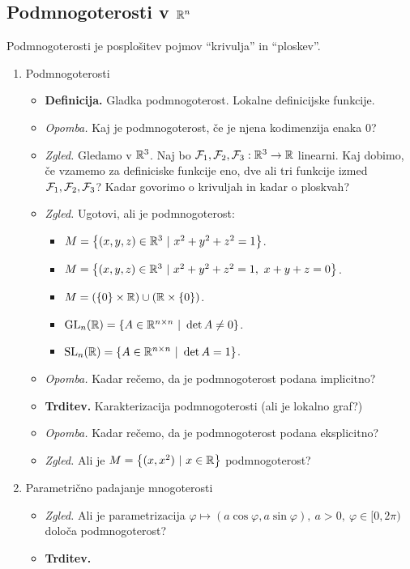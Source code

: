 \subsection{Podmnogoterosti v $\mathbb{R}^n$}
Podmnogoterosti je posplošitev pojmov "`krivulja"' in "`ploskev"'.
\begin{enumerate}
    \item Podmnogoterosti
    \begin{itemize}
        \item \colorbox{purple!30}{\textbf{Definicija.}} Gladka podmnogoterost. Lokalne definicijske funkcije.
        \item \colorbox{yellow!30}{\emph{Opomba.}} Kaj je podmnogoterost, če je njena kodimenzija enaka $0$?
        \item \colorbox{yellow!30}{\emph{Zgled.}} Gledamo v $\mathbb{R}^3$. Naj bo $\mathcal{F}_1, \mathcal{F}_2, \mathcal{F}_3: \mathbb{R}^3 \to \mathbb{R}$ linearni. Kaj dobimo, če vzamemo za definiciske funkcije eno, dve ali tri funkcije izmed $\mathcal{F}_1, \mathcal{F}_2, \mathcal{F}_3$? Kadar govorimo o krivuljah in kadar o ploskvah?
        \item \colorbox{yellow!30}{\emph{Zgled.}} Ugotovi, ali je podmnogoterost:
        \begin{itemize}
            \item $M = \left\{(x,y,z) \in \mathbb{R}^3 \ | \ x^2+y^2+z^2 = 1\right\}$.
            \item $M = \left\{(x,y,z) \in \mathbb{R}^3 \ | \ x^2+y^2+z^2 = 1, \ x+y+z = 0\right\}$.
            \item $M = (\left\{0\right\} \times \mathbb{R}) \cup (\mathbb{R} \times \left\{0\right\})$.
            \item $\operatorname{GL}_n(\mathbb{R}) = \left\{A \in \mathbb{R}^{n \times n} \ | \ \det A \neq 0\right\}$.
            \item $\operatorname{SL}_n(\mathbb{R}) = \left\{A \in \mathbb{R}^{n \times n} \ | \ \det A = 1\right\}$.
        \end{itemize}
        \item \colorbox{yellow!30}{\emph{Opomba.}} Kadar rečemo, da je podmnogoterost podana implicitno?
        \item \colorbox{blue!30}{\textbf{Trditev.}} Karakterizacija podmnogoterosti (ali je lokalno graf?)
        \item \colorbox{yellow!30}{\emph{Opomba.}} Kadar rečemo, da je podmnogoterost podana eksplicitno?
        \item \colorbox{yellow!30}{\emph{Zgled.}} Ali je $M = \left\{(x, x^2) \ | \ x \in \mathbb{R}\right\}$ podmnogoterost?
    \end{itemize}

    \item Parametrično padajanje mnogoterosti
    \begin{itemize}
        \item \colorbox{yellow!30}{\emph{Zgled.}} Ali je parametrizacija $\varphi \mapsto (a \cos \varphi, a \sin \varphi), \ a > 0, \ \varphi \in [0, 2 \pi)$ določa podmnogoterost?
        \item \colorbox{blue!30}{\textbf{Trditev.}}
    \end{itemize}
\end{enumerate}

